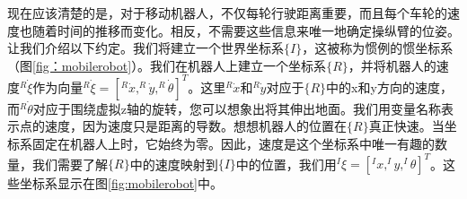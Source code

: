 
现在应该清楚的是，对于移动机器人，不仅每轮行驶距离重要，而且每个车轮的速度也随着时间的推移而变化。相反，不需要这些信息来唯一地确定操纵臂的位姿。让我们介绍以下约定。我们将建立一个世界坐标系$ \{I \} $，这被称为惯例的惯坐标系（图\ref {fig：mobilerobot}）。我们在机器人上建立一个坐标系$ \{R \} $，并将机器人的速度$ ^ R \dot{\xi} $作为向量$ ^R\dot{\xi} = [^R\dot{x},^R\dot{y},^R\dot{\theta}]^T $。这里$ ^R \dot {x} $和$ ^R \dot{y} $对应于$ \{R \} $中的x和y方向的速度，而$ ^R\dot{\theta} $对应于围绕虚拟z轴的旋转，您可以想象出将其伸出地面。我们用变量名称表示点的速度，因为速度只是距离的导数。想想机器人的位置在$ \{R \} $真正快速。当坐标系固定在机器人上时，它始终为零。因此，速度是这个坐标系中唯一有趣的数量，我们需要了解$ \{R \} $中的速度映射到$ \{I \} $中的位置，我们用$ ^ I\xi = [^Ix,^Iy,^I\theta]^T $。这些坐标系显示在图\ref{fig:mobilerobot}中。

